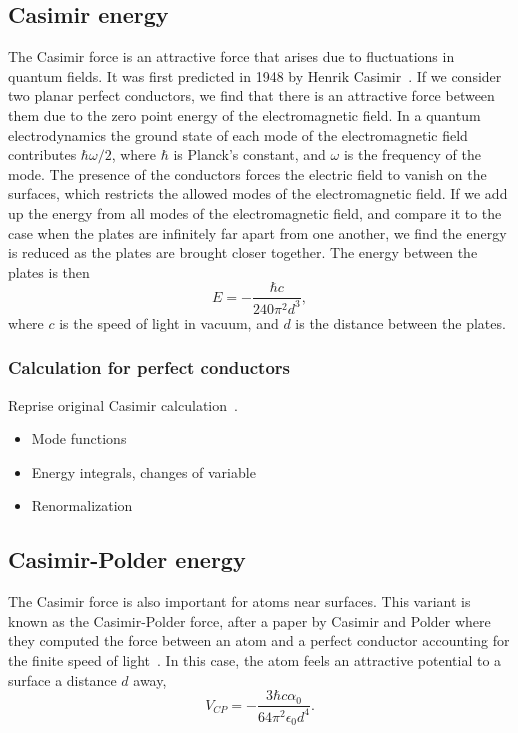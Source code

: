 \subsection{Casimir energy}

The Casimir force is an attractive force that arises due to fluctuations in quantum fields.  It was first predicted in 1948 by Henrik Casimir~\cite{Casimir1948}.  If we consider two planar perfect conductors, we find that there is an attractive force between them due to the zero point energy of the electromagnetic field.  In a quantum electrodynamics the ground state of each mode of the electromagnetic field contributes $\hbar\omega/2$, where $\hbar$ is Planck's constant, and $\omega$ is the frequency of the mode.  The presence of the conductors forces the electric field to vanish on the surfaces, which restricts the allowed modes of the electromagnetic field. If we add up the energy from all modes of the electromagnetic field, and compare it to the case when the plates are infinitely far apart from one another, we find the energy is reduced as the plates are brought closer together.  The energy between the plates is then
\begin{equation}
  E = -\frac{\hbar c}{240\pi^2 d^3},
\end{equation}
where $c$ is the speed of light in vacuum, and $d$ is the distance between the plates.

\subsubsection{Calculation for perfect conductors}

Reprise original Casimir calculation~\cite{Casimir1948}.  
\begin{itemize}
\item Mode functions
\item Energy integrals, changes of variable
\item Renormalization
\end{itemize}



\subsection{Casimir-Polder energy}

The Casimir force is also important for atoms near surfaces.  This variant is known as the Casimir-Polder force, after a paper by Casimir and Polder where they computed the force between an atom and a perfect conductor accounting for the finite speed of light~\cite{CasimirPolder1948}.  
In this case, the atom feels an attractive potential to a surface a distance $d$ away,
\begin{equation}
V_{CP} =-\frac{3\hbar c\alpha_0}{64\pi^2\epsilon_0 d^4}.
\end{equation}

